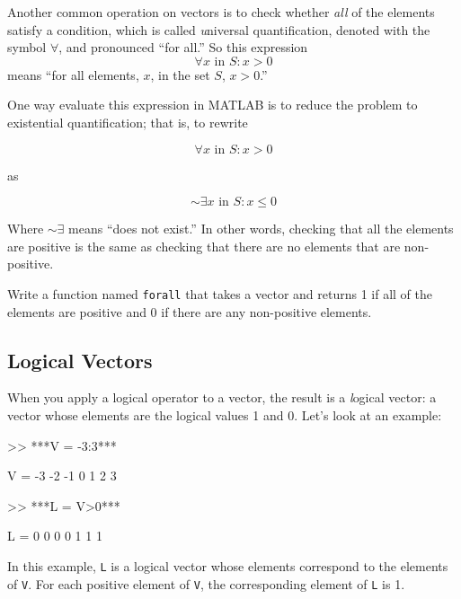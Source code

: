 
Another common operation on vectors is to check whether {\em all}
of the elements satisfy a condition, which is called {\emph universal quantification}, denoted with
the symbol $\forall$, and pronounced ``for all.''  So this
expression
%
\[ \forall x \mbox{~in~} S: x>0 \]
%
means ``for all elements, $x$, in the set $S$, $x>0$.''

One way evaluate this expression in MATLAB is to reduce the problem to
existential quantification; that is, to rewrite

\begin{equation}
\forall x \mbox{~in~} S: x>0
\end{equation}

as

\begin{equation}
\sim \exists x \mbox{~in~} S: x \le 0
\end{equation}

Where $\sim \exists$ means ``does not exist.''
In other words, checking that all the elements are positive is
the same as checking that there are no elements
that are non-positive.

\begin{ex}
Write a function named {\tt forall} that
takes a vector and returns 1 if all of the elements are positive
and 0 if there are any non-positive elements.
\end{ex}




\subsection{Logical Vectors}

When you apply a logical operator to a vector, the result is a 
{\emph logical vector}: a vector whose elements are the logical
values 1 and 0. Let's look at an example:


\begin{code}
>> ***V = -3:3***

V = -3    -2    -1     0     1     2     3

>> ***L = V>0***

L =  0     0     0     0     1     1     1
\end{code}

In this example, {\tt L} is a logical vector whose elements
correspond to the elements of {\tt V}.  For each positive element of
{\tt V}, the corresponding element of {\tt L} is 1.

